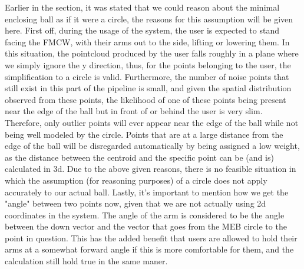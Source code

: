 Earlier in the section, it was stated that we could reason about the minimal enclosing ball as if it were a circle, the reasons for this assumption will be given here.
First off, during the usage of the system, the user is expected to stand facing the FMCW, with their arms out to the side, lifting or lowering them.
In this situation, the pointcloud produced by the user falls roughly in a plane where we simply ignore the y direction, thus, for the points belonging to the user, the simplification to a circle is valid.
Furthermore, the number of noise points that still exist in this part of the pipeline is small, and given the spatial distribution observed from these points, the likelihood of one of these points being present near the edge of the ball but in front of or behind the user is very slim.
Therefore, only outlier points will ever appear near the edge of the ball while not being well modeled by the circle.
Points that are at a large distance from the edge of the ball will be disregarded automatically by being assigned a low weight, as the distance between the centroid and the specific point can be (and is) calculated in 3d.
Due to the above given reasons, there is no feasible situation in which the assumption (for reasoning purposes) of a circle does not apply accurately to our actual ball.
Lastly, it's important to mention how we get the "angle" between two points now, given that we are not actually using 2d coordinates in the system.
The angle of the arm is considered to be the angle between the down vector and the vector that goes from the MEB circle to the point in question.
This has the added benefit that users are allowed to hold their arms at a somewhat forward angle if this is more comfortable for them, and the calculation still hold true in the same maner.



% 
